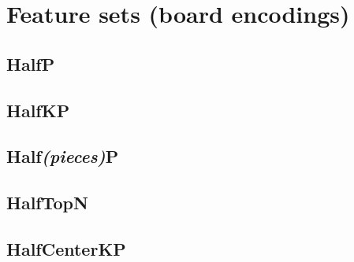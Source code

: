 
\section{Feature sets (board encodings)}
\subsection{HalfP}
\subsection{HalfKP}
\subsection{Half\textit{(pieces)}P}
\subsection{HalfTopN}
\subsection{HalfCenterKP}
